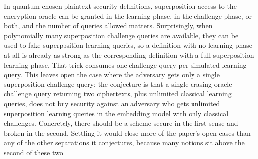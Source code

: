 \documentclass{aicr-conjecture}
\begin{document}

\vspace{0.4em}

\begin{informalconjecture}
In quantum chosen-plaintext security definitions, superposition access
to the encryption oracle can be granted in the learning phase, in the
challenge phase, or both, and the number of queries allowed matters.
Surprisingly, when polynomially many superposition challenge queries are
available, they can be used to fake superposition learning queries, so a
definition with no learning phase at all is already as strong as the
corresponding definition with a full superposition learning phase. That
trick consumes one challenge query per simulated learning query. This
leaves open the case where the adversary gets only a single
superposition challenge query: the conjecture is that a single
erasing-oracle challenge query returning two ciphertexts, plus unlimited
classical learning queries, does not buy security against an adversary
who gets unlimited superposition learning queries in the embedding model
with only classical challenges. Concretely, there should be a scheme
secure in the first sense and broken in the second. Settling it would
close more of the paper's open cases than any of the other separations
it conjectures, because many notions sit above the second of these two.
\end{informalconjecture}
\end{document}
